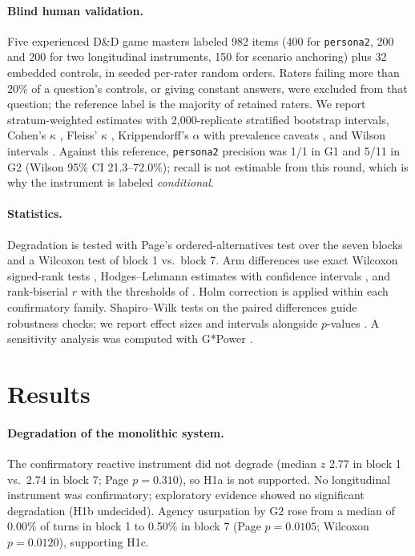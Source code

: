 \documentclass[11pt]{article}
\newcommand{\provisional}[1]{\textcolor{orange!80!black}{#1}}
\begin{document}
\paragraph{Blind human validation.} Five experienced D\&D game masters labeled 982 items (400 for \texttt{persona2}, 200 and 200 for two longitudinal instruments, 150 for scenario anchoring) plus 32 embedded controls, in seeded per-rater random orders. Raters failing more than 20\% of a question's controls, or giving constant answers, were excluded from that question; the reference label is the majority of retained raters. We report stratum-weighted estimates with 2{,}000-replicate stratified bootstrap intervals, Cohen's $\kappa$ \citep{cohen1960coefficient}, Fleiss' $\kappa$ \citep{fleiss1971measuring}, Krippendorff's $\alpha$ \citep{krippendorff2004content} with prevalence caveats \citep{byrt1993bias}, and Wilson intervals \citep{wilson1927probable}. Against this reference, \texttt{persona2} precision was \provisional{1/1 in G1 and 5/11 in G2 (Wilson 95\% CI 21.3--72.0\%)}; recall is not estimable from this round, which is why the instrument is labeled \emph{conditional}.

\paragraph{Statistics.} Degradation is tested with Page's ordered-alternatives test over the seven blocks \citep{page1963ordered} and a Wilcoxon test of block 1 vs.\ block 7. Arm differences use exact Wilcoxon signed-rank tests \citep{wilcoxon1945individual}, Hodges--Lehmann estimates with confidence intervals \citep{hodges1963estimates,lehmann2006nonparametrics}, and rank-biserial $r$ \citep{kerby2014simple,cliff1993dominance} with the thresholds of \citet{romano2006appropriate}. Holm correction \citep{holm1979simple} is applied within each confirmatory family. Shapiro--Wilk tests \citep{shapiro1965analysis} on the paired differences guide robustness checks; we report effect sizes and intervals alongside $p$-values \citep{wasserstein2016asa}. A sensitivity analysis was computed with G*Power \citep{faul2007gpower}.

\section{Results}\label{sec:results}
\paragraph{Degradation of the monolithic system.} The confirmatory reactive instrument did not degrade (median $z$ 2.77 in block 1 vs.\ 2.74 in block 7; Page $p=0.310$), so H1a is not supported. No longitudinal instrument was confirmatory; exploratory evidence showed no significant degradation (H1b undecided). Agency usurpation by G2 rose from a median of 0.00\% of turns in block 1 to 0.50\% in block 7 (Page $p=0.0105$; Wilcoxon $p=0.0120$), supporting H1c.
\end{document}
